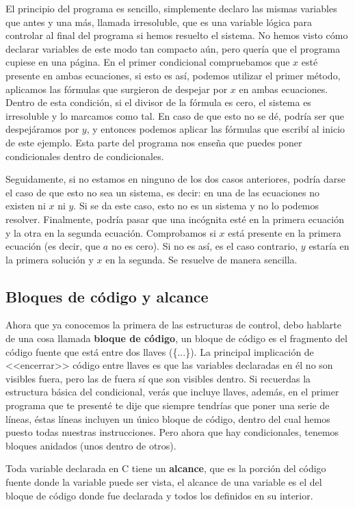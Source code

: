 \documentclass[a4paper]{article}
\begin{document}
El principio del programa es sencillo, simplemente declaro las mismas variables
que antes y una más, llamada irresoluble, que es una variable lógica para
controlar al final del programa si hemos resuelto el sistema. No hemos visto
cómo declarar variables de este modo tan compacto aún, pero quería que el
programa cupiese en una página.
En el primer condicional compruebamos que $x$ esté presente en ambas ecuaciones,
si esto es así, podemos utilizar el primer método, aplicamos las fórmulas que
surgieron de despejar por $x$ en ambas ecuaciones. Dentro de esta condición, si
el divisor de la fórmula es cero, el sistema es irresoluble y lo marcamos como
tal. En caso de que esto no se dé, podría ser que despejáramos por $y$,
y entonces podemos aplicar las fórmulas que escribí al inicio de este ejemplo.
Esta parte del programa nos enseña que puedes poner condicionales dentro de
condicionales.

Seguidamente, si no estamos en ninguno de los dos casos anteriores, podría darse
el caso de que esto no sea un sistema, es decir: en una de las ecuaciones no
existen ni $x$ ni $y$. Si se da este caso, esto no es un sistema y no lo podemos
resolver.
Finalmente, podría pasar que una incógnita esté en la primera ecuación y la otra
en la segunda ecuación. Comprobamos si $x$ está presente en la primera ecuación
(es decir, que $a$ no es cero). Si no es así, es el caso contrario, $y$ estaría
en la primera solución y $x$ en la segunda. Se resuelve de manera sencilla.
\subsection{Bloques de código y alcance}
Ahora que ya conocemos la primera de las estructuras de control, debo hablarte
de una cosa llamada \textbf{bloque de código}, un bloque de código es el
fragmento del código fuente que está entre dos llaves (\{...\}). La principal
implicación de <<encerrar>> código entre llaves es que las variables declaradas
en él no son visibles fuera, pero las de fuera sí que son visibles dentro.
Si recuerdas
la estructura básica del condicional, verás que incluye llaves, además, en el
primer programa que te presenté te dije que siempre tendrías que poner una serie
de líneas, éstas líneas incluyen un único bloque de código, dentro del cual
hemos puesto todas nuestras instrucciones. Pero ahora que hay condicionales,
tenemos bloques anidados (unos dentro de otros).

Toda variable declarada en C tiene un
\textbf{alcance}, que es la porción del
código fuente donde la variable puede ser vista, el alcance de una variable es
el del bloque de código donde fue declarada y todos los definidos en su
interior.
\end{document}
